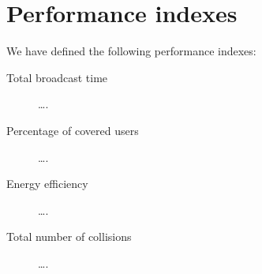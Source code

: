 \section{Performance indexes}\label{sec:indexes}

We have defined the following performance indexes:
\begin{description}
	\item[Total broadcast time] \ldots.
	\item[Percentage of covered users] \ldots.
	\item[Energy efficiency] \ldots.
	\item[Total number of collisions] \ldots.
\end{description}
